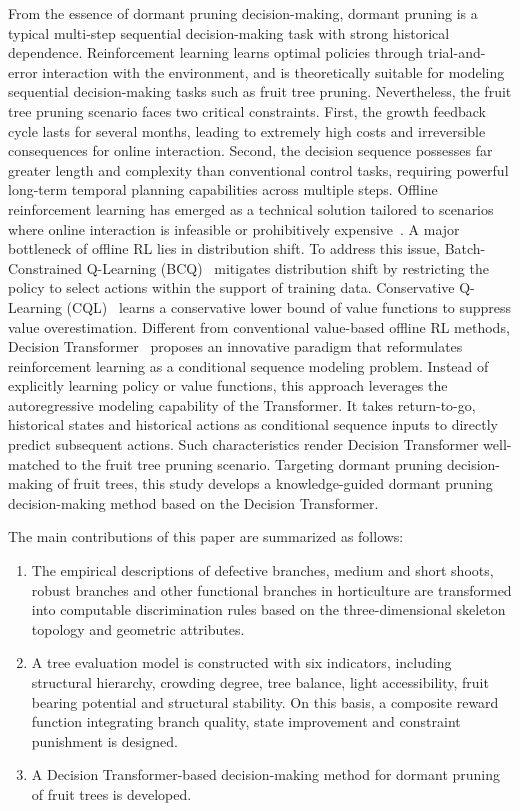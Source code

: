 \documentclass[12pt,a4paper,fontset=fandol]{ctexart}
\begin{document}
From the essence of dormant pruning decision-making, dormant pruning is a typical multi-step sequential decision-making task with strong historical dependence.
Reinforcement learning learns optimal policies through trial-and-error interaction with the environment, and is theoretically suitable for modeling sequential decision-making tasks such as fruit tree pruning.
Nevertheless, the fruit tree pruning scenario faces two critical constraints. First, the growth feedback cycle lasts for several months, leading to extremely high costs and irreversible consequences for online interaction.
Second, the decision sequence possesses far greater length and complexity than conventional control tasks, requiring powerful long-term temporal planning capabilities across multiple steps.
Offline reinforcement learning has emerged as a technical solution tailored to scenarios where online interaction is infeasible or prohibitively expensive~\citep{prudencio2023survey}.
A major bottleneck of offline RL lies in distribution shift.
To address this issue, Batch-Constrained Q-Learning (BCQ)~\citep{fujimoto2019bcq} mitigates distribution shift by restricting the policy to select actions within the support of training data.
Conservative Q-Learning (CQL)~\citep{kumar2020conservative} learns a conservative lower bound of value functions to suppress value overestimation.
Different from conventional value-based offline RL methods, Decision Transformer~\citep{chen2021decision} proposes an innovative paradigm that reformulates reinforcement learning as a conditional sequence modeling problem.
Instead of explicitly learning policy or value functions, this approach leverages the autoregressive modeling capability of the Transformer.
It takes return-to-go, historical states and historical actions as conditional sequence inputs to directly predict subsequent actions.
Such characteristics render Decision Transformer well-matched to the fruit tree pruning scenario.
Targeting dormant pruning decision-making of fruit trees, this study develops a knowledge-guided dormant pruning decision-making method based on the Decision Transformer.

The main contributions of this paper are summarized as follows:

\begin{enumerate}[label=\arabic*., leftmargin=2em]
  \item The empirical descriptions of defective branches, medium and short shoots, robust branches and other functional branches in horticulture are transformed into computable discrimination rules based on the three-dimensional skeleton topology and geometric attributes.

  \item A tree evaluation model is constructed with six indicators, including structural hierarchy, crowding degree, tree balance, light accessibility, fruit bearing potential and structural stability.
  On this basis, a composite reward function integrating branch quality, state improvement and constraint punishment is designed.

  \item A Decision Transformer-based decision-making method for dormant pruning of fruit trees is developed.
\end{enumerate}
\end{document}
